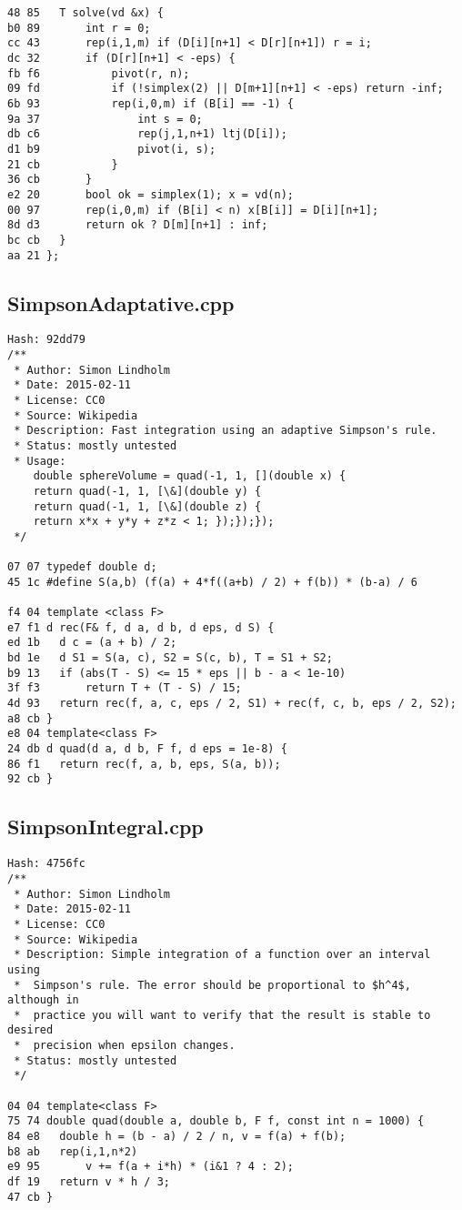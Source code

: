 \documentclass[11pt, a4paper, twoside]{article}
\begin{document}
\begin{lstlisting}
48 85 	T solve(vd &x) {
b0 89 		int r = 0;
cc 43 		rep(i,1,m) if (D[i][n+1] < D[r][n+1]) r = i;
dc 32 		if (D[r][n+1] < -eps) {
fb f6 			pivot(r, n);
09 fd 			if (!simplex(2) || D[m+1][n+1] < -eps) return -inf;
6b 93 			rep(i,0,m) if (B[i] == -1) {
9a 37 				int s = 0;
db c6 				rep(j,1,n+1) ltj(D[i]);
d1 b9 				pivot(i, s);
21 cb 			}
36 cb 		}
e2 20 		bool ok = simplex(1); x = vd(n);
00 97 		rep(i,0,m) if (B[i] < n) x[B[i]] = D[i][n+1];
8d d3 		return ok ? D[m][n+1] : inf;
bc cb 	}
aa 21 };
\end{lstlisting}

\subsection{SimpsonAdaptative.cpp}
\begin{lstlisting}
Hash: 92dd79
/**
 * Author: Simon Lindholm
 * Date: 2015-02-11
 * License: CC0
 * Source: Wikipedia
 * Description: Fast integration using an adaptive Simpson's rule.
 * Status: mostly untested
 * Usage:
	double sphereVolume = quad(-1, 1, [](double x) {
	return quad(-1, 1, [\&](double y) {
	return quad(-1, 1, [\&](double z) {
	return x*x + y*y + z*z < 1; });});});
 */

07 07 typedef double d;
45 1c #define S(a,b) (f(a) + 4*f((a+b) / 2) + f(b)) * (b-a) / 6

f4 04 template <class F>
e7 f1 d rec(F& f, d a, d b, d eps, d S) {
ed 1b 	d c = (a + b) / 2;
bd 1e 	d S1 = S(a, c), S2 = S(c, b), T = S1 + S2;
b9 13 	if (abs(T - S) <= 15 * eps || b - a < 1e-10)
3f f3 		return T + (T - S) / 15;
4d 93 	return rec(f, a, c, eps / 2, S1) + rec(f, c, b, eps / 2, S2);
a8 cb }
e8 04 template<class F>
24 db d quad(d a, d b, F f, d eps = 1e-8) {
86 f1 	return rec(f, a, b, eps, S(a, b));
92 cb }
\end{lstlisting}

\subsection{SimpsonIntegral.cpp}
\begin{lstlisting}
Hash: 4756fc
/**
 * Author: Simon Lindholm
 * Date: 2015-02-11
 * License: CC0
 * Source: Wikipedia
 * Description: Simple integration of a function over an interval using
 *  Simpson's rule. The error should be proportional to $h^4$, although in
 *  practice you will want to verify that the result is stable to desired
 *  precision when epsilon changes.
 * Status: mostly untested
 */

04 04 template<class F>
75 74 double quad(double a, double b, F f, const int n = 1000) {
84 e8 	double h = (b - a) / 2 / n, v = f(a) + f(b);
b8 ab 	rep(i,1,n*2)
e9 95 		v += f(a + i*h) * (i&1 ? 4 : 2);
df 19 	return v * h / 3;
47 cb }
\end{lstlisting}
\end{document}
